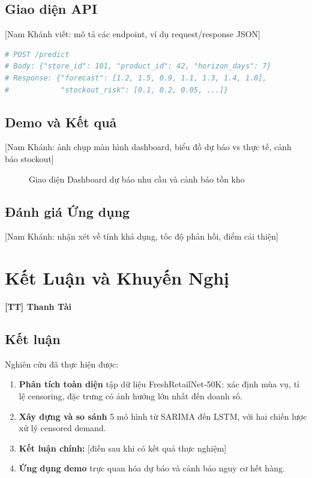 \documentclass[12pt,a4paper]{report}
\newcommand{\ownerTT}{\colorbox{red!15}{\textbf{[TT] Thanh Tài}}}
\begin{document}
\section{Giao diện API}

[Nam Khánh viết: mô tả các endpoint, ví dụ request/response JSON]

\begin{lstlisting}[caption=API endpoint dự báo nhu cầu, language=Python]
# POST /predict
# Body: {"store_id": 101, "product_id": 42, "horizon_days": 7}
# Response: {"forecast": [1.2, 1.5, 0.9, 1.1, 1.3, 1.4, 1.0],
#            "stockout_risk": [0.1, 0.2, 0.05, ...]}
\end{lstlisting}

\section{Demo và Kết quả}

[Nam Khánh: ảnh chụp màn hình dashboard, biểu đồ dự báo vs thực tế, cảnh báo stockout]

\begin{figure}[H]
    \centering
    \caption{Giao diện Dashboard dự báo nhu cầu và cảnh báo tồn kho}
\end{figure}

\section{Đánh giá Ứng dụng}

[Nam Khánh: nhận xét về tính khả dụng, tốc độ phản hồi, điểm cải thiện]

\newpage

\chapter{Kết Luận và Khuyến Nghị}
\ownerTT

\section{Kết luận}

Nghiên cứu đã thực hiện được:

\begin{enumerate}
    \item \textbf{Phân tích toàn diện} tập dữ liệu FreshRetailNet-50K: xác định mùa vụ, tỉ lệ censoring, đặc trưng có ảnh hưởng lớn nhất đến doanh số.
    \item \textbf{Xây dựng và so sánh} 5 mô hình từ SARIMA đến LSTM, với hai chiến lược xử lý censored demand.
    \item \textbf{Kết luận chính:} [điền sau khi có kết quả thực nghiệm]
    \item \textbf{Ứng dụng demo} trực quan hóa dự báo và cảnh báo nguy cơ hết hàng.
\end{enumerate}
\end{document}
